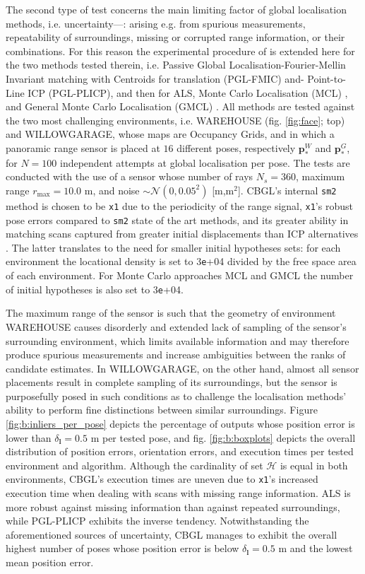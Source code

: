 The second type of test concerns the main limiting factor of global
localisation methods, i.e. uncertainty---: arising e.g. from spurious
measurements, repeatability of surroundings, missing or corrupted range
information, or their combinations. For this reason the experimental procedure
of \cite{Filotheou2022g} is extended here for the two methods tested therein,
i.e. Passive Global Localisation-Fourier-Mellin Invariant matching with
Centroids for translation (PGL-FMIC) and- Point-to-Line ICP (PGL-PLICP), and
then for ALS, Monte Carlo Localisation (MCL) \cite{mcl}, and General Monte
Carlo Localisation (GMCL) \cite{gmcl}. All methods are tested against the two
most challenging environments, i.e.  WAREHOUSE (fig. \ref{fig:face}; top) and
WILLOWGARAGE, whose maps are Occupancy Grids, and in which a panoramic range
sensor is placed at $16$ different poses, respectively $\bm{p}_{\ast}^{W}$ and
$\bm{p}_{\ast}^{G}$, for $N = 100$ independent attempts at global localisation
per pose. The tests are conducted with the use of a sensor whose number of rays
$N_s = 360$, maximum range $r_{\max} = 10.0$ m, and noise $\sim \mathcal{N}(0,
0.05^2)$ [m,m$^2$].  CBGL's internal \texttt{sm2} method is chosen to be
\texttt{x1} due to the periodicity of the range signal, \texttt{x1}'s robust
pose errors compared to \texttt{sm2} state of the art methods, and its greater
ability in matching scans captured from greater initial displacements than ICP
alternatives \cite{Filotheou2023a}.  The latter translates to the need for
smaller initial hypotheses sets: for each environment the locational density is
set to $3$\texttt{e}+04 divided by the free space area of each environment. For
Monte Carlo approaches MCL and GMCL the number of initial hypotheses is also
set to $3$\texttt{e}+04.

The maximum range of the sensor is such that the geometry of environment
WAREHOUSE causes disorderly and extended lack of sampling of the sensor's
surrounding environment, which limits available information and may therefore
produce spurious measurements and increase ambiguities between the ranks of
candidate estimates. In WILLOWGARAGE, on the other hand, almost all sensor
placements result in complete sampling of its surroundings, but the sensor is
purposefully posed in such conditions as to challenge the localisation methods'
ability to perform fine distinctions between similar surroundings. Figure
\ref{fig:b:inliers_per_pose} depicts the percentage of outputs whose position
error is lower than $\delta_{\bm{l}} = 0.5$ m per tested pose, and fig.
\ref{fig:b:boxplots} depicts the overall distribution of position errors,
orientation errors, and execution times per tested environment and algorithm.
Although the cardinality of set $\mathcal{H}$ is equal in both environments,
CBGL's execution times are uneven due to \texttt{x1}'s increased execution time
when dealing with scans with missing range information. ALS is more robust
against missing information than against repeated surroundings, while PGL-PLICP
exhibits the inverse tendency. Notwithstanding the aforementioned sources of
uncertainty, CBGL manages to exhibit the overall highest number of poses whose
position error is below $\delta_{\bm{l}} = 0.5$ m and the lowest mean position
error.

